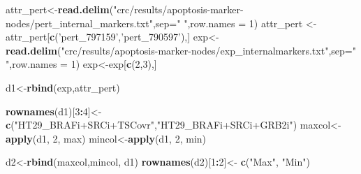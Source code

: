 \documentclass[
]{book}
\newenvironment{Shaded}{\begin{snugshade}}{\end{snugshade}}
\newcommand{\DataTypeTok}[1]{\textcolor[rgb]{0.13,0.29,0.53}{#1}}
\newcommand{\DecValTok}[1]{\textcolor[rgb]{0.00,0.00,0.81}{#1}}
\newcommand{\KeywordTok}[1]{\textcolor[rgb]{0.13,0.29,0.53}{\textbf{#1}}}
\newcommand{\NormalTok}[1]{#1}
\newcommand{\OperatorTok}[1]{\textcolor[rgb]{0.81,0.36,0.00}{\textbf{#1}}}
\newcommand{\StringTok}[1]{\textcolor[rgb]{0.31,0.60,0.02}{#1}}
\begin{document}
\begin{Shaded}
\begin{Highlighting}[]
\NormalTok{attr_pert<-}\KeywordTok{read.delim}\NormalTok{(}\StringTok{"crc/results/apoptosis-marker-nodes/pert_internal_markers.txt"}\NormalTok{,}\DataTypeTok{sep=}\StringTok{" "}\NormalTok{,}\DataTypeTok{row.names =} \DecValTok{1}\NormalTok{)}
\NormalTok{attr_pert <-attr_pert[}\KeywordTok{c}\NormalTok{(}\StringTok{'pert_797159'}\NormalTok{,}\StringTok{'pert_790597'}\NormalTok{),]}
\NormalTok{exp<-}\KeywordTok{read.delim}\NormalTok{(}\StringTok{"crc/results/apoptosis-marker-nodes/exp_internalmarkers.txt"}\NormalTok{,}\DataTypeTok{sep=}\StringTok{" "}\NormalTok{,}\DataTypeTok{row.names =} \DecValTok{1}\NormalTok{)}
\NormalTok{exp<-exp[}\KeywordTok{c}\NormalTok{(}\DecValTok{2}\NormalTok{,}\DecValTok{3}\NormalTok{),]}

\NormalTok{d1<-}\KeywordTok{rbind}\NormalTok{(exp,attr_pert)}

\KeywordTok{rownames}\NormalTok{(d1)[}\DecValTok{3}\OperatorTok{:}\DecValTok{4}\NormalTok{]<-}\StringTok{ }\KeywordTok{c}\NormalTok{(}\StringTok{"HT29_BRAFi+SRCi+TSCovr"}\NormalTok{,}\StringTok{"HT29_BRAFi+SRCi+GRB2i"}\NormalTok{)}
\NormalTok{maxcol<-}\KeywordTok{apply}\NormalTok{(d1, }\DecValTok{2}\NormalTok{, max)}
\NormalTok{mincol<-}\KeywordTok{apply}\NormalTok{(d1, }\DecValTok{2}\NormalTok{, min)}

\NormalTok{d2<-}\KeywordTok{rbind}\NormalTok{(maxcol,mincol, d1)}
\KeywordTok{rownames}\NormalTok{(d2)[}\DecValTok{1}\OperatorTok{:}\DecValTok{2}\NormalTok{]<-}\StringTok{ }\KeywordTok{c}\NormalTok{(}\StringTok{"Max"}\NormalTok{, }\StringTok{"Min"}\NormalTok{)}


\end{Highlighting}
\end{Shaded}
\end{document}
